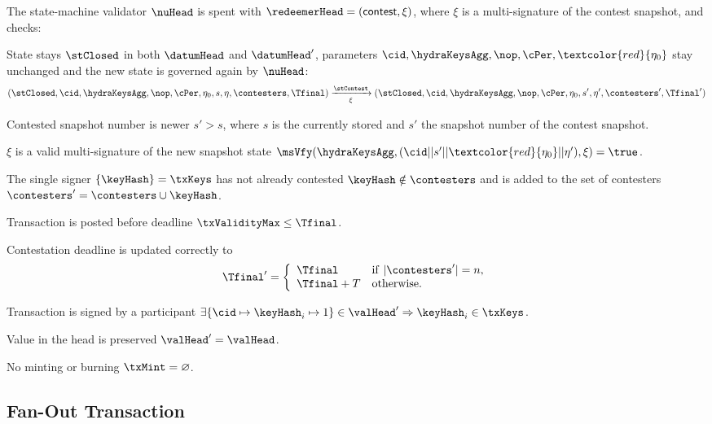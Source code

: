 \begin{samepage}
	\noindent The state-machine validator $\nuHead$ is spent with
	$\redeemerHead = (\mathsf{contest}, \xi)$, where $\xi$ is a multi-signature of
	the contest snapshot, and checks:
	\begin{menumerate}
		\item State stays $\stClosed$ in both $\datumHead$ and $\datumHead'$,
		parameters $\cid,\hydraKeysAgg,\nop,\cPer, \textcolor{red}{\eta_{0}}$ stay
		unchanged and the new state is governed again by $\nuHead$:
		\[
			(\stClosed,\cid,\hydraKeysAgg,\nop,\cPer,\eta_0,s,\eta,\contesters,\Tfinal) \xrightarrow[\xi]{\stContest} (\stClosed,\cid,\hydraKeysAgg,\nop,\cPer,\eta_0,s',\eta',\contesters',\Tfinal')
		\]
	  \item Contested snapshot number is newer $s' > s$, where $s$ is the
		currently stored and $s'$ the snapshot number of the contest snapshot.
		\item $\xi$ is a valid multi-signature of the new snapshot state
		$\msVfy(\hydraKeysAgg,(\cid || s' || \textcolor{red}{\eta_{0}} || \eta'),\xi) = \true$. 
		\item The single signer $\{\keyHash\} = \txKeys$ has not already contested
		$\keyHash \notin \contesters$ and is added to the set of contesters
		$\contesters' = \contesters \cup \keyHash$.
		\item Transaction is posted before deadline $\txValidityMax \leq \Tfinal$.
		\item Contestation deadline is updated correctly to
		\[
			\Tfinal' = \left\{\begin{array}{ll}
				\Tfinal     & \mathrm{if} ~ |\contesters'| = n, \\
				\Tfinal + T & \mathrm{otherwise.}
			\end{array}\right.
		\]
		\item Transaction is signed by a participant
		$\exists \{\cid \mapsto \keyHash_{i} \mapsto 1\} \in \valHead' \Rightarrow \keyHash_{i} \in \txKeys$.
		\item Value in the head is preserved $\valHead' = \valHead$.
		\item No minting or burning $\txMint = \varnothing$.
	\end{menumerate}
\end{samepage}

\subsection{Fan-Out Transaction}

